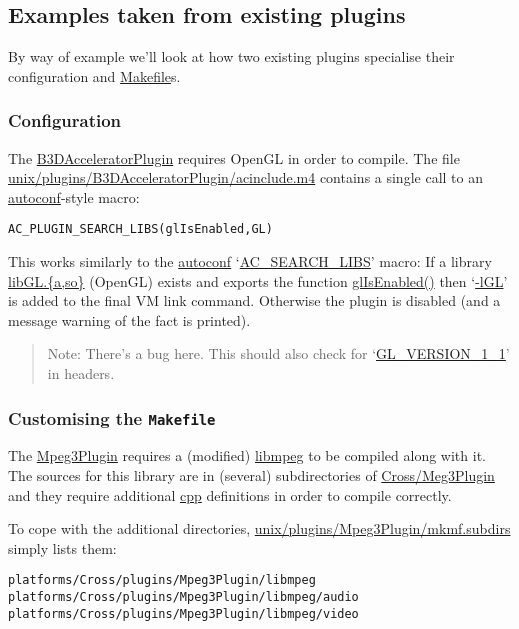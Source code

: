 \documentclass{article}
\newcommand{\cmd}{\url}
\newcommand{\cmd}{\texttt}
\newenvironment{note}{\begin{quote}\color{red} Note: }{\end{quote}}
\begin{document}
\subsection{Examples taken from existing plugins}

By way of example we'll look at how two existing plugins specialise
their configuration and \cmd{Makefile}s.

\subsubsection{Configuration}

The \cmd{B3DAcceleratorPlugin} requires OpenGL in order to compile.
The file \cmd{unix/plugins/B3DAcceleratorPlugin/acinclude.m4}
contains a single call to an \cmd{autoconf}-style macro:

\begin{alltt}
    AC\_PLUGIN\_SEARCH\_LIBS(glIsEnabled, GL)
\end{alltt}

This works similarly to the \cmd{autoconf} `\cmd{AC\_SEARCH_LIBS}'
macro: If a library \cmd{libGL.\{a,so\}} (OpenGL) exists and exports
the function \cmd{glIsEnabled()} then `\cmd{-lGL}' is added to the
final VM link command.  Otherwise the plugin is disabled (and a
message warning of the fact is printed).

\begin{note}
There's a bug here.  This should also check for `\cmd{GL\_VERSION\_1\_1}' in headers.
\end{note}


\subsubsection{Customising the \texttt{Makefile}}

The \cmd{Mpeg3Plugin} requires a (modified) \cmd{libmpeg} to be
compiled along with it.  The sources for this library are in (several)
subdirectories of \cmd{Cross/Meg3Plugin} and they require additional
\cmd{cpp} definitions in order to compile correctly.

To cope with the additional directories,
\cmd{unix/plugins/Mpeg3Plugin/mkmf.subdirs}
simply lists them:

\begin{alltt}
  platforms/Cross/plugins/Mpeg3Plugin/libmpeg
  platforms/Cross/plugins/Mpeg3Plugin/libmpeg/audio
  platforms/Cross/plugins/Mpeg3Plugin/libmpeg/video
\end{alltt}
\end{document}
